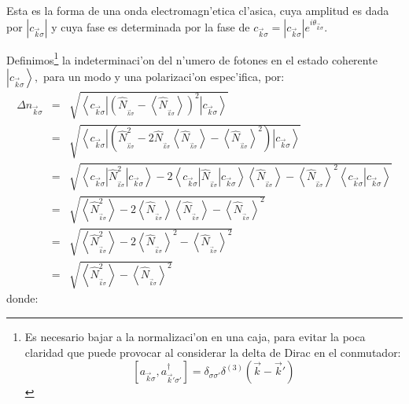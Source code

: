 Esta es la forma de una onda electromagn'etica cl'asica, cuya amplitud
es dada por $|c_{\vec{k}\sigma}|$ y cuya fase es determinada por la fase de
$c_{\vec{k}\sigma}=|c_{\vec{k}\sigma}|e^{i\theta_{\vec{k}\sigma}}.$

Definimos\footnote{Es necesario bajar a la normalizaci'on en una caja, para
evitar la poca claridad que puede provocar al considerar la delta de Dirac en
el conmutador:%
\begin{equation}
\left[ a_{\vec{k}\sigma},a_{\vec{k}'\sigma '}^{\dagger}\right] =\delta_{\sigma\sigma '}\delta^{\left( 3\right) }\left( \vec{k}-\vec{k}'\right)
\end{equation}
} la indeterminaci'on del n'umero de fotones en el estado coherente
$\left| c_{\vec{k}\sigma}\right> ,$ para un modo y una
polarizaci'on espec'ifica, por:%
\begin{eqnarray}
\Delta n_{\vec{k}\sigma} & = &\sqrt{\left\langle c_{\vec{k}\sigma}\right|
\left( \hat{N}_{_{\vec{k}\sigma}}-\left\langle \hat{N}_{_{\vec{k}\sigma}%
}\right> \right) ^{2}\left| c_{\vec{k}\sigma}\right> }\\
& = &\sqrt{\left\langle c_{\vec{k}\sigma}\right| \left( \hat{N}_{_{\vec
{k}\sigma}}^{2}-2\hat{N}_{_{\vec{k}\sigma}}\left\langle \hat{N}_{_{\vec
{k}\sigma}}\right> -\left\langle \hat{N}_{_{\vec{k}\sigma}}\right>
^{2}\right) \left| c_{\vec{k}\sigma}\right> }\\
& = &\sqrt{\left\langle c_{\vec{k}\sigma}\right| \hat{N}_{_{\vec{k}\sigma}%
}^{2}\left| c_{\vec{k}\sigma}\right> -2\left\langle c_{\vec{k}%
\sigma}\right| \hat{N}_{_{\vec{k}\sigma}}\left| c_{\vec{k}\sigma
}\right> \left\langle \hat{N}_{_{\vec{k}\sigma}}\right>
-\left\langle \hat{N}_{_{\vec{k}\sigma}}\right> ^{2}\left\langle
c_{\vec{k}\sigma}\right| \left. c_{\vec{k}\sigma}\right> }\\
& = &\sqrt{\left\langle \hat{N}_{_{\vec{k}\sigma}}^{2}\right>
-2\left\langle \hat{N}_{_{\vec{k}\sigma}}\right> \left\langle \hat
{N}_{_{\vec{k}\sigma}}\right> -\left\langle \hat{N}_{_{\vec{k}\sigma}%
}\right> ^{2}}\\
& = &\sqrt{\left\langle \hat{N}_{_{\vec{k}\sigma}}^{2}\right>
-2\left\langle \hat{N}_{_{\vec{k}\sigma}}\right> ^{2}-\left\langle
\hat{N}_{_{\vec{k}\sigma}}\right> ^{2}}\\
& = &\sqrt{\left\langle \hat{N}_{_{\vec{k}\sigma}}^{2}\right>
-\left\langle \hat{N}_{_{\vec{k}\sigma}}\right> ^{2}}%
\end{eqnarray}
donde:%
